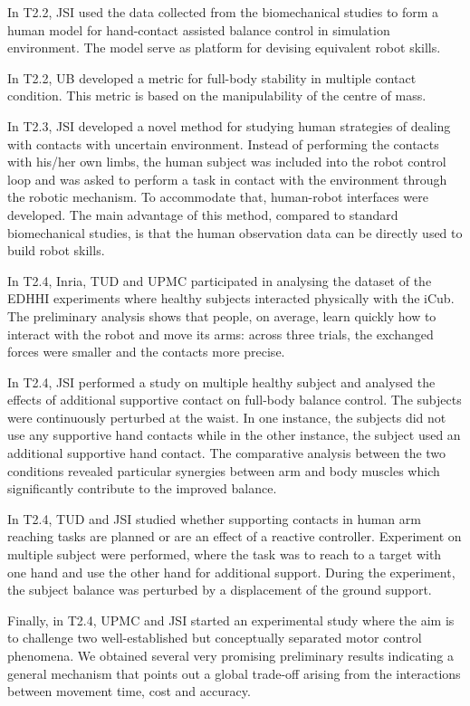 In T2.2, JSI used the data collected from the biomechanical studies to form a human model for hand-contact assisted balance control in simulation environment. The model serve as platform for devising equivalent robot skills.

In T2.2, UB developed a metric for full-body stability in multiple contact condition. This metric is based on the manipulability of the centre of mass.

In T2.3, JSI developed a novel method for studying human strategies of dealing with contacts with uncertain environment. Instead of performing the contacts with his/her own limbs, the human subject was included into the robot control loop and was asked to perform a task in contact with the environment through the robotic mechanism. To accommodate that, human-robot interfaces were developed. The main advantage of this method, compared to standard biomechanical studies, is that the human observation data can be directly used to build robot skills.

In T2.4, Inria, TUD and UPMC participated in analysing the dataset of the EDHHI experiments where healthy subjects interacted physically with the iCub. The preliminary analysis shows that people, on average, learn quickly how to interact with the robot and move its arms: across three trials, the exchanged forces were smaller and the contacts more precise.

In T2.4, JSI performed a study on multiple healthy subject and analysed the effects of additional supportive contact on full-body balance control. The subjects were continuously perturbed at the waist. In one instance, the subjects did not use any supportive hand contacts while in the other instance, the subject used an additional supportive hand contact. The comparative analysis between the two conditions revealed particular synergies between arm and body muscles which significantly contribute to the improved balance.

In T2.4, TUD and JSI studied whether supporting contacts in human arm reaching tasks are planned or are an effect of a reactive controller. Experiment on multiple subject were performed, where the task was to reach to a target with one hand and use the other hand for additional support. During the experiment, the subject balance was perturbed by a displacement of the ground support.

Finally, in T2.4, UPMC and JSI started an experimental study where the aim is to challenge two well-established but conceptually separated motor control phenomena. We obtained several very promising preliminary results indicating a general mechanism that points out a global trade-off arising from the interactions between movement time, cost and accuracy.
